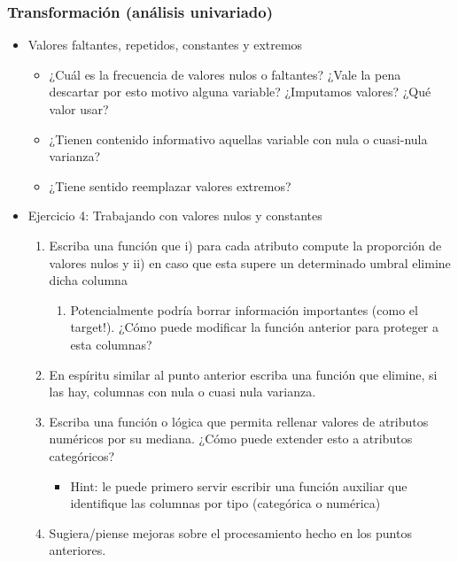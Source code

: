 \documentclass[leqno, 10pt, envcountsect]{beamer}
\numberwithin{equation}{section}
\theoremstyle{definition}
\theoremstyle{example}
\numberwithin{figure}{section}
\numberwithin{table}{section}
\let\olditem\item
\renewcommand{\item}{%
\olditem\vspace{1pt}}
\begin{document}
\begin{frame}
  \frametitle{Transformación (análisis univariado)}
  \begin{itemize}
    \item Valores faltantes, repetidos, constantes y extremos
    \begin{itemize}
        \item  ¿Cuál es la frecuencia de valores
          nulos o faltantes? ¿Vale la pena descartar por esto motivo alguna
          variable? ¿Imputamos valores? ¿Qué valor usar?
        \item ¿Tienen contenido informativo aquellas variable con nula o
          cuasi-nula varianza?
        \item ¿Tiene sentido reemplazar valores extremos?
  \end{itemize}
  \item Ejercicio 4: Trabajando con valores nulos y constantes
    \begin{enumerate}
      \item Escriba una función que i) para cada atributo compute la proporción de
        valores nulos y ii) en caso que esta supere un determinado umbral
        elimine dicha columna
        \begin{enumerate}
          \item Potencialmente podría borrar información importantes (como el
            target!). ¿Cómo puede modificar la función anterior para proteger a
            esta columnas?
        \end{enumerate}
      \item En espíritu similar al punto anterior escriba una función que elimine,
        si las hay, columnas con nula o
        cuasi nula varianza.
      \item Escriba una función o lógica que permita rellenar valores de
        atributos numéricos por su mediana. ¿Cómo puede extender esto a
        atributos categóricos? %
        \begin{itemize}
          \item Hint: le puede primero servir escribir una función auxiliar que
            identifique las columnas por tipo (categórica o numérica)
        \end{itemize}
      \item Sugiera/piense mejoras sobre el procesamiento hecho en los puntos
        anteriores. %
    \end{enumerate}
  \end{itemize}
\end{frame}
\end{document}
